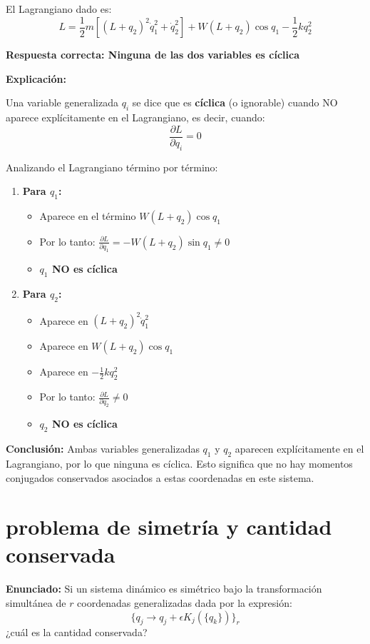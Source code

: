\documentclass[a4paper]{article}
\begin{document}
El Lagrangiano dado es:
$$L = \frac{1}{2}m\left[(L+q_2)^2\dot{q}_1^2 + \dot{q}_2^2\right] + W(L+q_2)\cos q_1 - \frac{1}{2}kq_2^2$$

\textbf{Respuesta correcta: Ninguna de las dos variables es cíclica}

\textbf{Explicación:}

Una variable generalizada $q_i$ se dice que es \textbf{cíclica} (o ignorable) cuando NO aparece explícitamente en el Lagrangiano, es decir, cuando:
$$\frac{\partial L}{\partial q_i} = 0$$

Analizando el Lagrangiano término por término:

\begin{enumerate}
    \item \textbf{Para $q_1$:}
    \begin{itemize}
        \item Aparece en el término $W(L+q_2)\cos q_1$
        \item Por lo tanto: $\frac{\partial L}{\partial q_1} = -W(L+q_2)\sin q_1 \neq 0$
        \item \textbf{$q_1$ NO es cíclica}
    \end{itemize}
    
    \item \textbf{Para $q_2$:}
    \begin{itemize}
        \item Aparece en $(L+q_2)^2\dot{q}_1^2$
        \item Aparece en $W(L+q_2)\cos q_1$
        \item Aparece en $-\frac{1}{2}kq_2^2$
        \item Por lo tanto: $\frac{\partial L}{\partial q_2} \neq 0$
        \item \textbf{$q_2$ NO es cíclica}
    \end{itemize}
\end{enumerate}

\textbf{Conclusión:} Ambas variables generalizadas $q_1$ y $q_2$ aparecen explícitamente en el Lagrangiano, por lo que ninguna es cíclica. Esto significa que no hay momentos conjugados conservados asociados a estas coordenadas en este sistema.


\section{problema de simetría y cantidad conservada}

\textbf{Enunciado:} Si un sistema dinámico es simétrico bajo la transformación simultánea de $r$ coordenadas generalizadas dada por la expresión:
$$\{q_j \rightarrow q_j + \epsilon K_j(\{q_k\})\}_r$$
¿cuál es la cantidad conservada?
\end{document}
